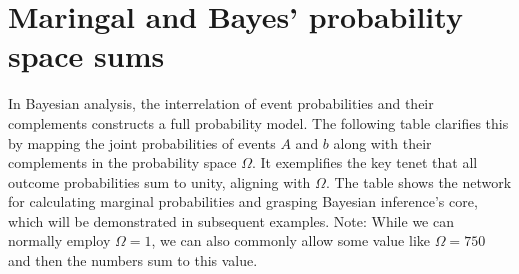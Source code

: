 \documentclass[
  12 pt,
  a4paper,
]{book}
\numberwithin{equation}{section}
\theoremstyle{plain}      %
\theoremstyle{definition} %
\theoremstyle{remark}     %
\theoremstyle{note}         %
\begin{document}
\newpage

\hypertarget{maringal-and-bayes-probability-space-sums}{%
\section{Maringal and Bayes' probability space
sums}\label{maringal-and-bayes-probability-space-sums}}

In Bayesian analysis, the interrelation of event probabilities and their
complements constructs a full probability model. The following table
clarifies this by mapping the joint probabilities of events \(A\) and
\(b\) along with their complements in the probability space \(\Omega\).
It exemplifies the key tenet that all outcome probabilities sum to
unity, aligning with \(\Omega\). The table shows the network for
calculating marginal probabilities and grasping Bayesian inference's
core, which will be demonstrated in subsequent examples. Note: While we
can normally employ \(\Omega = 1\), we can also commonly allow some
value like \(\Omega = 750\) and then the numbers sum to this value.
\end{document}

